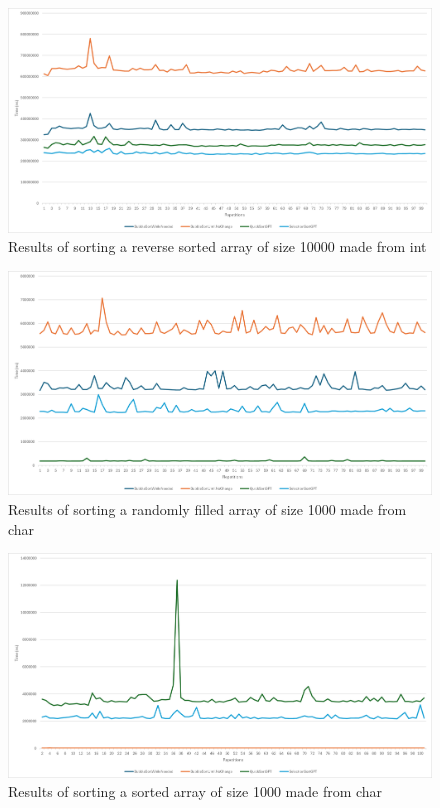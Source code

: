 \documentclass{article}
\begin{document}
    \begin{figure}[!h]
        \centering
        \includegraphics[width=0.7\linewidth]{int_10000_reverse_sorted.png}
        \caption{Results of sorting a reverse sorted array of size 10000 made from int}
        \label{fig:int_10000_reverse_sorted}
    \end{figure}


    \begin{figure}[!h]
        \centering
        \includegraphics[width=0.7\linewidth]{char_1000_random.png}
        \caption{Results of sorting a randomly filled array of size 1000 made from char}
        \label{fig:char_1000_random}
    \end{figure}
    
    \begin{figure}[!h]
        \centering
        \includegraphics[width=0.7\linewidth]{char_1000_sorted.png}
        \caption{Results of sorting a sorted array of size 1000 made from char}
        \label{fig:char_1000_sorted}
    \end{figure}
    
\end{document}
